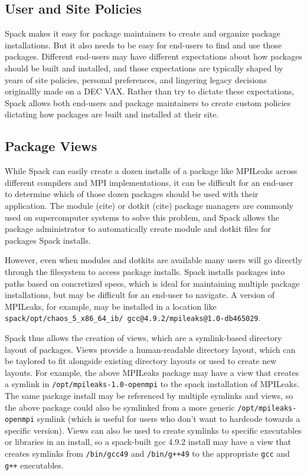 
\subsection{User and Site Policies}
\label{sec:usecase-policy}

Spack makes it easy for package maintainers to create and organize package installations.  But it also needs to be easy for end-users to find and use those packages.  Different end-users may have different expectations about how packages should be built and installed, and those expectations are typically shaped by years of site policies, personal preferences, and lingering legacy decisions originallly made on a DEC VAX.  Rather than try to dictate these expectations, Spack allows both end-users and package maintainers to create custom policies dictating how packages are built and installed at their site.

\subsection{Package Views}
\label{sec:package-views}

While Spack can easily create a dozen installs of a package like MPILeaks across different compilers and MPI implementations, it can be difficult for an end-user to determine which of those dozen packages should be used with their application.  The module (cite) or dotkit (cite) package managers are commonly used on supercomputer systems to solve this problem, and Spack allows the package administrator to automatically create module and dotkit files for packages Spack installs.

However, even when modules and dotkits are available many users will go directly through the filesystem to access package installs.  Spack installs packages into paths based on concretized specs, which is ideal for maintaining multiple package installations, but may be difficult for an end-user to navigate.  A version of MPILeaks, for example, may be installed in a location like {\tt spack/opt/chaos\_5\_x86\_64\_ib/ gcc@4.9.2/mpileaks@1.0-db465029}.

Spack thus allows the creation of views, which are a symlink-based directory layout of packages.  Views provide a human-readable directory layout, which can be taylored to fit alongside existing directory layouts or used to create new layouts.  For example, the above MPILeaks package may have a view that creates a symlink in {\tt /opt/mpileaks-1.0-openmpi} to the spack installation of MPILeaks.  The same package install may be referenced by multiple symlinks and views, so the above package could also be symlinked from a more generic {\tt /opt/mpileaks-openmpi} symlink (which is useful for users who don't want to hardcode towards a specific version).  Views can also be used to create symlinks to specific executables or libraries in an install, so a spack-built gcc 4.9.2 install may have a view that creates symlinks from {\tt /bin/gcc49} and {\tt /bin/g++49} to the appropriate {\tt gcc} and {\tt g++} executables.

